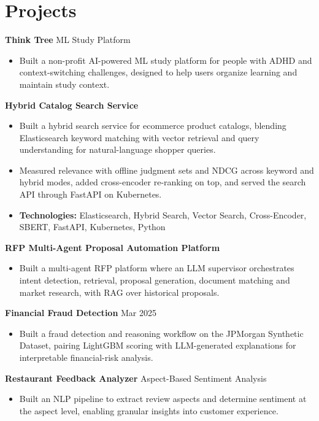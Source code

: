 \documentclass[10pt,a4paper]{article}
\begin{document}
\section{Projects}
\textbf{Think Tree} \textbar{} ML Study Platform\par
\begin{itemize}
  \item Built a non-profit AI-powered ML study platform for people with ADHD and context-switching challenges, designed to help users organize learning and maintain study context.
\end{itemize}
\textbf{Hybrid Catalog Search Service}\par
\begin{itemize}
  \item Built a hybrid search service for ecommerce product catalogs, blending Elasticsearch keyword matching with vector retrieval and query understanding for natural-language shopper queries.
  \item Measured relevance with offline judgment sets and NDCG across keyword and hybrid modes, added cross-encoder re-ranking on top, and served the search API through FastAPI on Kubernetes.
  \item \textbf{Technologies:} Elasticsearch, Hybrid Search, Vector Search, Cross-Encoder, SBERT, FastAPI, Kubernetes, Python
\end{itemize}
\textbf{RFP Multi-Agent Proposal Automation Platform}\par
\begin{itemize}
  \item Built a multi-agent RFP platform where an LLM supervisor orchestrates intent detection, retrieval, proposal generation, document matching and market research, with RAG over historical proposals.
\end{itemize}
\textbf{Financial Fraud Detection} \textbar{} Mar 2025\par
\begin{itemize}
  \item Built a fraud detection and reasoning workflow on the JPMorgan Synthetic Dataset, pairing LightGBM scoring with LLM-generated explanations for interpretable financial-risk analysis.
\end{itemize}
\textbf{Restaurant Feedback Analyzer} \textbar{} Aspect-Based Sentiment Analysis\par
\begin{itemize}
  \item Built an NLP pipeline to extract review aspects and determine sentiment at the aspect level, enabling granular insights into customer experience.
\end{itemize}
\end{document}
